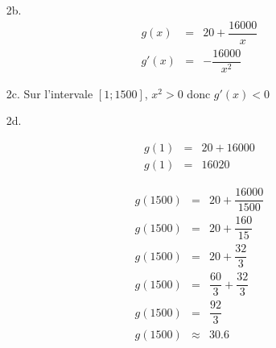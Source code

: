 \documentclass[11pt]{article}
\begin{document}
\begin{enumerate}

\item[2b.] 
  \begin{eqnarray*}
    g(x)  &=& 20 + \dfrac{16000}{x} \\
    g'(x) &=& -\dfrac{16000}{x^2}
  \end{eqnarray*}
  
\item[2c.] Sur l'intervale $[1 ; 1500]$, $x^2 > 0$ donc $g'(x) < 0$
  
\item[2d.]

  \begin{eqnarray*}
    g(1) &=& 20 + 16000\\
    g(1) &=& 16020
  \end{eqnarray*}


  \begin{eqnarray*}
    g(1500) &=& 20 + \dfrac{16000}{1500}\\
    g(1500) &=& 20 + \dfrac{160}{15}\\
    g(1500) &=& 20 + \dfrac{32}{3}\\
    g(1500) &=& \dfrac{60}{3} + \dfrac{32}{3}\\
    g(1500) &=& \dfrac{92}{3}\\
    g(1500) &\approx& 30.6
  \end{eqnarray*}


\end{enumerate} 
\end{document}
